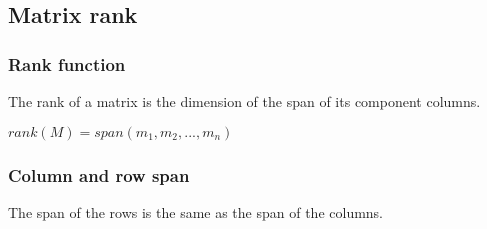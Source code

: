 
\subsection{Matrix rank}
\subsubsection{Rank function}

The rank of a matrix is the dimension of the span of its component columns.

\(rank (M)=span(m_1,m_2,...,m_n)\)

\subsubsection{Column and row span}

The span of the rows is the same as the span of the columns.


